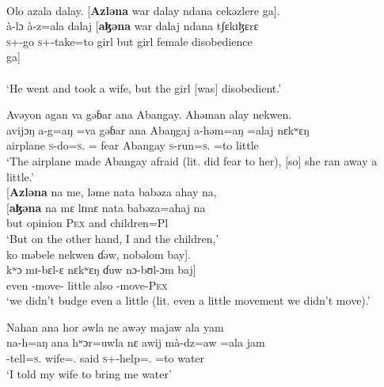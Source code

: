 \ea \label{ex:12:53}
\\
Olo  azala  dalay.  [\textbf{Azləna}  war  dalay  ndana  cekəzlere  ga].\\
\gll  à-lɔ   à-z=ala   dalaj  [\textbf{aɮəna}  war   dalaj   ndana   tʃɛkɪɮɛrɛ\\   
      \textsc{s}+{\PFV}-go  \textsc{s}+{\PFV}-take=to  girl  but  girl  female  {\DEM}  disobedience\\ 
      
      \medskip
      ga]\\
      {\ADJ}\\
\glt  ‘He went and took a wife, but the girl [was] disobedient.’
\z 

\ea \label{ex:12:54}
Avəyon  agan  va  gəɓar  ana  Abangay.  Ahəman  alay  nekwen.\\  
\gll  avijɔŋ  a-g=aŋ       =va     gəɓar   ana   Abaŋgaj    a-həm=aŋ  =alaj   nɛkʷɛŋ \\     
      airplane  \textsc{s}-do=\textsc{s}.{\IO} ={\PRF}  fear  {\DAT} Abangay  \textsc{s}-run=\textsc{s}.{\IO}   =to    little  \\         
\glt ‘The airplane made Abangay afraid (lit. did fear to her), [so] she ran away a little.’\\

\medskip
\clearpage
{}[\textbf{Azləna}  na  me,  ləme  nata  babəza  ahay  na,\\  
\gll {}[\textbf{aɮəna} na mɛ lɪmɛ nata babəza=ahaj na\\ 
     but    {\PSP}  opinion  \textsc{Pex}  and  children=Pl  {\PSP} \\
\glt ‘But on the other hand, I and the children,’\\

\medskip
ko  məbele  nekwen  ɗəw,  nobəlom  bay].\\
\gll kʷɔ mɪ-bɛl-ɛ nɛkʷɛŋ ɗuw nɔ-bʊl-ɔm baj]\\
     even  {\NOM}{}-move-{\CL}  little  also  {\oneS}-move-\textsc{Pex}  {\NEG}\\
\glt  ‘we didn’t budge even a little (lit. even a little movement we didn’t move).’ 
\z 

\largerpage
\ea \label{ex:12:55}
Nahan  ana  hor  əwla  ne  awəy  majaw  ala  yam\\  
\gll  na-h=aŋ    ana  hʷɔr=uwla    nɛ  awij   mà-dz=aw  =ala jam\\  
      {\oneS}-tell=\textsc{s}.{\IO}  {\DAT} wife={\oneS}.{\POSS}  {\oneS}  said      \textsc{s}+{\HOR}-help={\oneS}.{\IO}    =to  water\\  
\glt ‘I told my wife to bring me water’\\     


